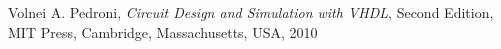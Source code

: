 
\begin{thebibliography}{9}
  Volnei A. Pedroni,
  \emph{Circuit Design and Simulation with VHDL},
  Second Edition,
  MIT Press,
  Cambridge,
  Massachusetts,
  USA,
  2010
\end{thebibliography}
